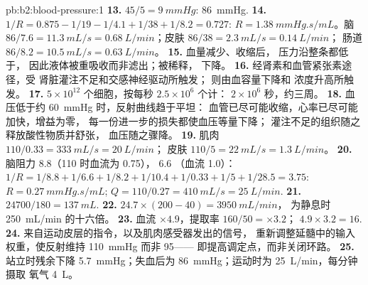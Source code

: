 \begin{solution}{pb:b2:blood-pressure:1}
\textbf{13.} $45/5 = \qty{9}{mmHg}$: \qty{86}{mmHg}.
\textbf{14.} $1/R = 0.875 - 1/19 - 1/4.1 + 1/38 + 1/8.2 = 0.727$: $R =
\qty{1.38}{mmHg.s/mL}$。脑 $86/7.6 = \qty{11.3}{mL/s} =
\qty{0.68}{L/min}$；皮肤 $86/38 = \qty{2.3}{mL/s} = \qty{0.14}{L/min}$；
肠道 $86/8.2 = \qty{10.5}{mL/s} = \qty{0.63}{L/min}$。
\textbf{15.} 血量减少、收缩后，
压力沿整条都低于，
因此液体被重吸收而非滤出；被稀释，
下降。
\textbf{16.} 经肾素和血管紧张素途径，受
肾脏灌注不足和交感神经驱动所触发；
则由血容量下降和
浓度升高所触发。
\textbf{17.} $5\times 10^{12}$ 个细胞，按每秒 $2.5\times 10^{6}$ 个计：
$2\times 10^{6}$ 秒，约三周。
\textbf{18.} 血压低于约 \qty{60}{mmHg} 时，反射曲线趋于平坦：
血管已尽可能收缩，心率已尽可能加快，增益为零，
每一份进一步的损失都使血压等量下降；
灌注不足的组织随之释放酸性物质并舒张，
血压随之骤降。
\textbf{19.} 肌肉 $110/0.33 = \qty{333}{mL/s} = \qty{20}{L/min}$；
皮肤 $110/5 = \qty{22}{mL/s} = \qty{1.3}{L/min}$。
\textbf{20.} 脑阻力 $8.8$（110 时血流为 0.75）， $6.6$
（血流 1.0）：$1/R = 1/8.8 + 1/6.6 + 1/8.2 + 1/10.4 + 1/0.33 + 1/5 +
1/28.5 = 3.75$: $R = \qty{0.27}{mmHg.s/mL}$; $Q = 110/0.27 =
\qty{410}{mL/s} = \qty{25}{L/min}$.
\textbf{21.} $\num{24700}/180 = \qty{137}{mL}$.
\textbf{22.} $24.7\times(200 - 40) = \qty{3950}{mL/min}$，
为静息时 \qty{250}{mL/min} 的十六倍。
\textbf{23.} 血流 $\times 4.9$，提取率 $160/50 = \times 3.2$；
$4.9\times 3.2 = 16$.
\textbf{24.} 来自运动皮层的指令，以及肌肉感受器发出的信号，
重新调整延髓中的输入权重，使反射维持
\qty{110}{mmHg} 而非 95——
即提高调定点，而非关闭环路。
\textbf{25.} 站立时残余下降 \qty{5.7}{mmHg}；失血后为
\qty{86}{mmHg}；运动时为 \qty{25}{L/min}，每分钟摄取
氧气 \qty{4}{L}。
\end{solution}
